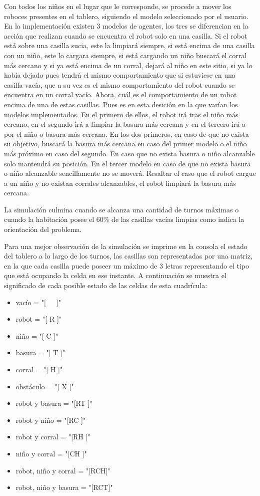 \documentclass[titlepage,11pt]{scrartcl}
\begin{document}
Con todos los niños en el lugar que le corresponde, se procede a mover los roboces presentes en el tablero, siguiendo el modelo seleccionado por el usuario. En la implementación existen 3 modelos de agentes, los tres se diferencian en la acción que realizan cuando se encuentra el robot solo en una casilla. Si el robot está sobre una casilla sucia, este la limpiará siempre, si está encima de una casilla con un niño, este lo cargara siempre, si está cargando un niño buscará el corral más cercano y si ya está encima de un corral, dejará al niño en este sitio, si ya lo había dejado pues tendrá el mismo comportamiento que si estuviese en una casilla vacía, que a su vez es el mismo comportamiento del robot cuando se encuentra en un corral vacío. Ahora, cuál es el comportamiento de un robot encima de una de estas casillas. Pues es en esta desición en la que varían los modelos implementados. En el primero de ellos, el robot irá tras el niño más cercano, en el segundo irá a limpiar la basura más cercana y en el tercero irá a por el niño o basura más cercana. En los dos primeros, en caso de que no exista su objetivo, buscará la basura más cercana en caso del primer modelo o el niño más próximo en caso del segundo. En caso que no exista basura o niño alcanzable solo mantendrá su posición. En el tercer modelo en caso de que no exista basura o niño alcanzable sencillamente no se moverá. Resaltar el caso que el robot cargue a un niño y no existan corrales alcanzables, el robot limpiará la basura más cercana.

La simulación culmina cuando se alcanza una cantidad de turnos máximas o cuando la habitación posee el 60\% de las casillas vacías limpias como indica la orientación del problema.

Para una mejor observación de la simulación se imprime en la consola el estado del tablero a lo largo de los turnos, las casillas son representadas por una matriz, en la que cada casilla puede poseer un máximo de 3 letras representando el tipo que está ocupando la celda en ese instante. A continuación se muestra el significado de cada posible estado de las celdas de esta cuadrícula:

\begin{itemize}
    \item vacío = "[\ \ \ ]"
    \item robot = "[ R ]"
    \item niño = "[ C ]"
    \item basura = "[ T ]"
    \item corral = "[ H ]"
    \item obstáculo = "[ X ]"
    \item robot y basura = "[RT ]"
    \item robot y niño = "[RC ]"
    \item robot y corral = "[RH ]"
    \item niño y corral = "[CH ]"
    \item robot, niño y corral = "[RCH]"
    \item robot, niño y basura = "[RCT]"
\end{itemize}
\end{document}

